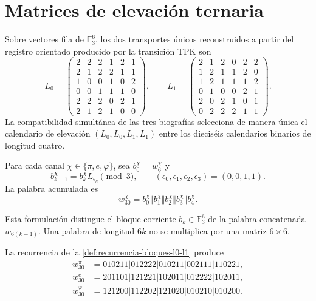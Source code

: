 \section{Matrices de elevación ternaria}

Sobre vectores fila de \(\mathbb F_3^6\), los dos transportes únicos
reconstruidos a partir del registro orientado producido por la transición TPK
son
\[
L_0=
\begin{pmatrix}
2&2&2&1&2&1\\
2&1&2&2&1&1\\
1&0&0&1&0&2\\
0&0&1&1&1&0\\
2&2&2&0&2&1\\
2&1&2&1&0&0
\end{pmatrix},
\qquad
L_1=
\begin{pmatrix}
2&1&2&0&2&2\\
1&2&1&1&2&0\\
1&2&1&1&1&2\\
0&1&0&0&2&1\\
2&0&2&1&0&1\\
0&2&2&2&1&1
\end{pmatrix}.
\]
La compatibilidad simultánea de las tres biografías selecciona de manera única
el calendario de elevación \((L_0,L_0,L_1,L_1)\) entre los dieciséis
calendarios binarios de longitud cuatro.

\begin{definition}
\label{def:recurrencia-bloques-l0-l1}
Para cada canal \(\chi\in\{\pi,e,\varphi\}\), sea
\(b_0^\chi=w_6^\chi\) y
\[
 b_{k+1}^\chi=b_k^\chi L_{\epsilon_k}\pmod3,
 \qquad
 (\epsilon_0,\epsilon_1,\epsilon_2,\epsilon_3)=(0,0,1,1).
\]
La palabra acumulada es
\[
 w_{30}^\chi
 =b_0^\chi\Vert b_1^\chi\Vert b_2^\chi
  \Vert b_3^\chi\Vert b_4^\chi.
\]
\end{definition}

Esta formulación distingue el bloque corriente \(b_k\in\mathbb F_3^6\) de
la palabra concatenada \(w_{6(k+1)}\). Una palabra de longitud \(6k\) no
se multiplica por una matriz \(6\times6\).

\begin{theorem}
\label{thm:palabras-w30}
La recurrencia de la \cref{def:recurrencia-bloques-l0-l1} produce
\begin{align*}
w_{30}^{\pi}
 &=010211|012222|010211|002111|110221,\\
w_{30}^{e}
 &=201101|121221|102011|012222|102011,\\
w_{30}^{\varphi}
 &=121200|112202|121020|010210|010200.
\end{align*}
\end{theorem}

